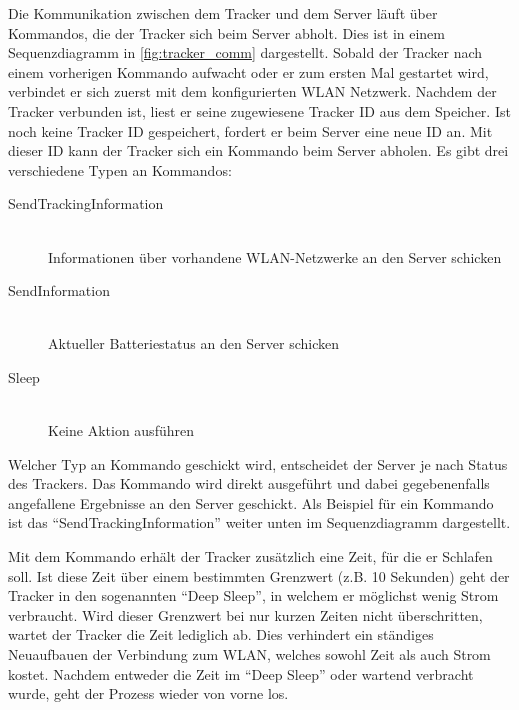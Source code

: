 Die Kommunikation zwischen dem Tracker und dem Server läuft über Kommandos, die der Tracker sich beim Server abholt.
Dies ist in einem Sequenzdiagramm in \autoref{fig:tracker_comm} dargestellt.
Sobald der Tracker nach einem vorherigen Kommando aufwacht oder er zum ersten Mal gestartet wird, verbindet er sich zuerst
mit dem konfigurierten \gls{WLAN} Netzwerk.
Nachdem der Tracker verbunden ist, liest er seine zugewiesene Tracker ID aus dem Speicher.
Ist noch keine Tracker ID gespeichert, fordert er beim Server eine neue ID an.
Mit dieser ID kann der Tracker sich ein Kommando beim Server abholen.
Es gibt drei verschiedene Typen an Kommandos:
\begin{description}
	\item[SendTrackingInformation] \hfill \\
		Informationen über vorhandene \gls{WLAN}-Netzwerke an den Server schicken
	\item[SendInformation] \hfill \\
		Aktueller Batteriestatus an den Server schicken
	\item[Sleep] \hfill \\
		Keine Aktion ausführen
\end{description}
Welcher Typ an Kommando geschickt wird, entscheidet der Server je nach Status des Trackers.
Das Kommando wird direkt ausgeführt und dabei gegebenenfalls angefallene Ergebnisse an den Server geschickt.
Als Beispiel für ein Kommando ist das \enquote{SendTrackingInformation} weiter unten im Sequenzdiagramm dargestellt.

Mit dem Kommando erhält der Tracker zusätzlich eine Zeit, für die er Schlafen soll.
Ist diese Zeit über einem bestimmten Grenzwert (z.B. 10 Sekunden) geht der Tracker in den sogenannten \enquote{Deep Sleep},
in welchem er möglichst wenig Strom verbraucht.
Wird dieser Grenzwert bei nur kurzen Zeiten nicht überschritten, wartet der Tracker die Zeit lediglich ab.
Dies verhindert ein ständiges Neuaufbauen der Verbindung zum \gls{WLAN}, welches sowohl Zeit als auch Strom kostet.
Nachdem entweder die Zeit im \enquote{Deep Sleep} oder wartend verbracht wurde, geht der Prozess wieder von vorne los.


